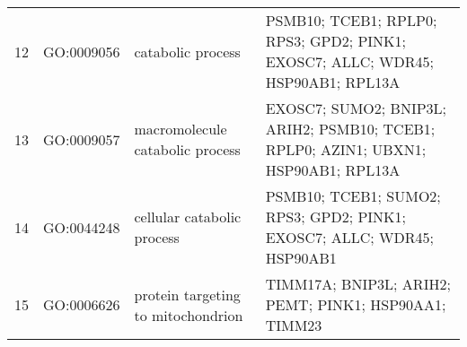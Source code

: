 \begin{table}[htp]
\begin{center}
\begin{tabular}{|c|c|p{1.5in}|p{4in}|}
12 & GO:0009056 & catabolic process & \footnotesize{PSMB10; TCEB1; RPLP0; RPS3; GPD2; PINK1; EXOSC7; ALLC; WDR45; HSP90AB1; RPL13A} \\ 
13 & GO:0009057 & macromolecule catabolic process & \footnotesize{EXOSC7; SUMO2; BNIP3L; ARIH2; PSMB10; TCEB1; RPLP0; AZIN1; UBXN1; HSP90AB1; RPL13A} \\ 
14 & GO:0044248 & cellular catabolic process & \footnotesize{PSMB10; TCEB1; SUMO2; RPS3; GPD2; PINK1; EXOSC7; ALLC; WDR45; HSP90AB1} \\ 
 15 & GO:0006626 & protein targeting to mitochondrion  & \footnotesize{TIMM17A; BNIP3L; ARIH2; PEMT; PINK1; HSP90AA1; TIMM23} \\ 

\end{tabular}
\end{center}
\end{table}
